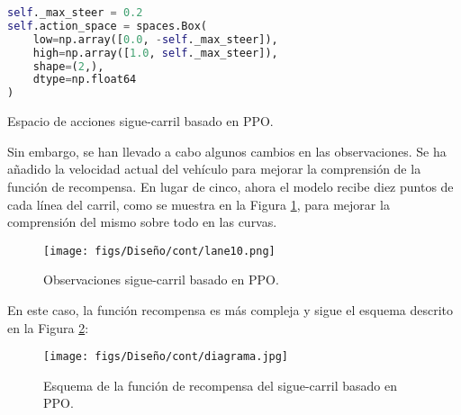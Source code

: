 \begin{code}[h]
\begin{lstlisting}[language=Python]
self._max_steer = 0.2
self.action_space = spaces.Box(
    low=np.array([0.0, -self._max_steer]),
    high=np.array([1.0, self._max_steer]),
    shape=(2,),
    dtype=np.float64
)
\end{lstlisting}
\caption[Espacio de acciones sigue-carril basado en \ac{PPO}]{Espacio de acciones sigue-carril basado en \ac{PPO}.}
\label{cod:acc_ppo}
\end{code}

Sin embargo, se han llevado a cabo algunos cambios en las observaciones. Se ha añadido la velocidad actual del vehículo para mejorar la comprensión de la función de recompensa. En lugar de cinco, ahora el modelo recibe diez puntos de cada línea del carril, como se muestra en la Figura \ref{fig:puntos_carril_ppo}, para mejorar la comprensión del mismo sobre todo en las curvas.
\begin{figure}[ht]
\centering
\texttt{[image: figs/Diseño/cont/lane10.png]}
\caption{Observaciones sigue-carril basado en \ac{PPO}.}
\label{fig:puntos_carril_ppo}
\end{figure}

\newpage

En este caso, la función recompensa es más compleja y sigue el esquema descrito en la Figura \ref{fig:esquema_PPO}:

\begin{figure}[ht]
\centering
\texttt{[image: figs/Diseño/cont/diagrama.jpg]}
\caption{Esquema de la función de recompensa del sigue-carril basado en \ac{PPO}.}
\label{fig:esquema_PPO}
\end{figure}

